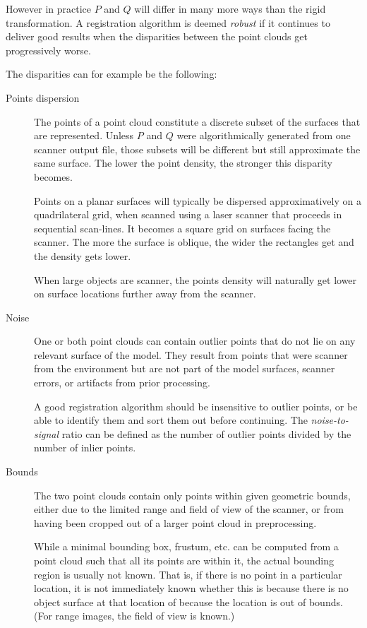 However in practice $P$ and $Q$ will differ in many more ways than the rigid transformation. A registration algorithm is deemed \emph{robust} if it continues to deliver good results when the disparities between the point clouds get progressively worse.

The disparities can for example be the following:
\begin{description}
\item[Points dispersion] The points of a point cloud constitute a discrete subset of the surfaces that are represented. Unless $P$ and $Q$ were algorithmically generated from one scanner output file, those subsets will be different but still approximate the same surface. The lower the point density, the stronger this disparity becomes.

Points on a planar surfaces will typically be dispersed approximatively on a quadrilateral grid, when scanned using a laser scanner that proceeds in sequential scan-lines. It becomes a square grid on surfaces facing the scanner. The more the surface is oblique, the wider the rectangles get and the density gets lower.

When large objects are scanner, the points density will naturally get lower on surface locations further away from the scanner. 

\item[Noise] One or both point clouds can contain outlier points that do not lie on any relevant surface of the model. They result from points that were scanner from the environment but are not part of the model surfaces, scanner errors, or artifacts from prior processing.

A good registration algorithm should be insensitive to outlier points, or be able to identify them and sort them out before continuing. The \emph{noise-to-signal} ratio can be defined as the number of outlier points divided by the number of inlier points.

\item[Bounds] The two point clouds contain only points within given geometric bounds, either due to the limited range and field of view of the scanner, or from having been cropped out of a larger point cloud in preprocessing.

While a minimal bounding box, frustum, etc. can be computed from a point cloud such that all its points are within it, the actual bounding region is usually not known. That is, if there is no point in a particular location, it is not immediately known whether this is because there is no object surface at that location of because the location is out of bounds. (For range images, the field of view is known.)


\end{description}

